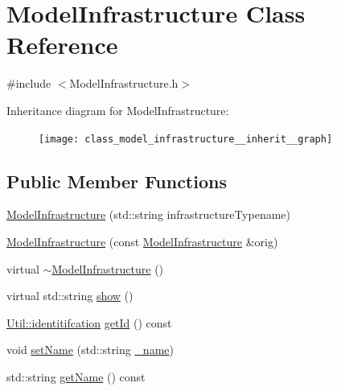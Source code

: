 \hypertarget{class_model_infrastructure}{\section{Model\-Infrastructure Class Reference}
\label{class_model_infrastructure}
}


{\ttfamily \#include $<$Model\-Infrastructure.\-h$>$}



Inheritance diagram for Model\-Infrastructure\-:\nopagebreak
\begin{figure}[H]
\begin{center}
\leavevmode
\texttt{[image: class\_model\_infrastructure\_\_inherit\_\_graph]}
\end{center}
\end{figure}
\subsection*{Public Member Functions}
\begin{DoxyCompactItemize}
\item 
\hyperlink{class_model_infrastructure_aa7e7206a487b4e3ac89df8a23546a187}{Model\-Infrastructure} (std\-::string infrastructure\-Typename)
\item 
\hyperlink{class_model_infrastructure_a530efed59a4cd02b607849dc0538eddf}{Model\-Infrastructure} (const \hyperlink{class_model_infrastructure}{Model\-Infrastructure} \&orig)
\item 
virtual \hyperlink{class_model_infrastructure_aeedd4148c2b9c97600789f884c2ef549}{$\sim$\-Model\-Infrastructure} ()
\item 
virtual std\-::string \hyperlink{class_model_infrastructure_a649a5a89a0c9931783d3c51de2acf266}{show} ()
\item 
\hyperlink{class_util_ad17d458d9344b10bba64347e514d6d71}{Util\-::identitifcation} \hyperlink{class_model_infrastructure_aa4d3fa8f302cc6dc4fccdd3187e6a168}{get\-Id} () const 
\item 
void \hyperlink{class_model_infrastructure_a8ebb1f9b4475e732d31b6c8980ddccc0}{set\-Name} (std\-::string \hyperlink{class_model_infrastructure_aa73c0444ba8e3515e2aec3154eaad85d}{\-\_\-name})
\item 
std\-::string \hyperlink{class_model_infrastructure_ac06ca99d36c8d1a957697ef003e979b1}{get\-Name} () const 
\end{DoxyCompactItemize}
